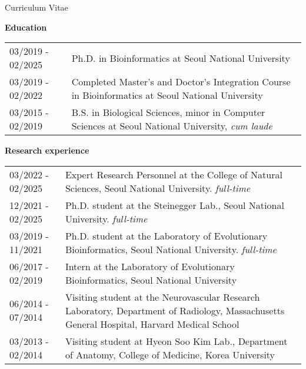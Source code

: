 \documentclass{resume} %
\begin{document}


\setcounter{tocdepth}{1}

\pagestyle{plain}
\setcounter{page}{1}

\setlength{\oddsidemargin}{-0.2cm}
\setlength{\evensidemargin}{-0.2cm}
\setlength{\linewidth}{16.5cm}
\setlength{\textheight}{26cm}
\setlength{\tabcolsep}{0cm}


\begin{rSection}{Curriculum Vitae}
\vspace{2mm}

{\bf Education}\vspace{1mm}

\begin{tabular}{p{3.6cm}p{13.0cm}}
03/2019 - 02/2025 & Ph.D. in Bioinformatics at Seoul National University
\\[1.mm]
03/2019 - 02/2022 & Completed Master's and Doctor's Integration Course in Bioinformatics at Seoul National University
\\[1.mm]
03/2015 - 02/2019 & B.S. in Biological Sciences, minor in Computer Sciences at Seoul National University, \textit{cum laude}
\\[1mm]
\end{tabular}
\vspace{1mm}

{\bf Research experience}\vspace{1mm}

\begin{tabular}{p{3.6cm}p{13.0cm}}
03/2022 - 02/2025 & Expert Research Personnel at the College of Natural Sciences, Seoul National University. \textit{full-time}
\\[1.mm]
12/2021 - 02/2025 & Ph.D. student at the Steinegger Lab., Seoul National University. \textit{full-time}
\\[1.mm]
03/2019 - 11/2021 & Ph.D. student at the Laboratory of Evolutionary Bioinformatics, Seoul National University. \textit{full-time}
\\[1.mm]
06/2017 - 02/2019 & Intern at the Laboratory of Evolutionary Bioinformatics, Seoul National University
\\[1.mm]
06/2014 - 07/2014 & Visiting student at the Neurovascular Research Laboratory, Department of Radiology, Massachusetts General Hospital, Harvard Medical School
\\[1.mm]
03/2013 - 02/2014 & Visiting student at Hyeon Soo Kim Lab., Department of Anatomy, College of Medicine, Korea University
\\[1.mm]
\end{tabular}
\vspace{1mm}
\end{rSection}
\end{document}
